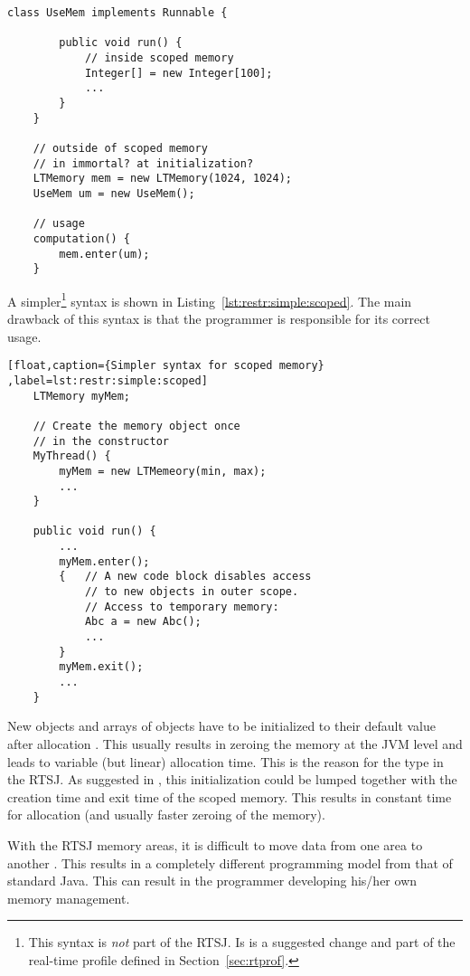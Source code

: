 \begin{lstlisting}[float,caption={Correct usage of scoped memory in the RTSJ},
label=lst:restr:correct:scoped]
    class UseMem implements Runnable {

        public void run() {
            // inside scoped memory
            Integer[] = new Integer[100];
            ...
        }
    }

    // outside of scoped memory
    // in immortal? at initialization?
    LTMemory mem = new LTMemory(1024, 1024);
    UseMem um = new UseMem();

    // usage
    computation() {
        mem.enter(um);
    }
\end{lstlisting}



A simpler\footnote{This syntax is \emph{not} part of the RTSJ. Is is
a suggested change and part of the real-time profile defined in
Section~\ref{sec:rtprof}.} syntax is shown in
Listing~\ref{lst:restr:simple:scoped}. The main drawback of this
syntax is that the programmer is responsible for its correct usage.

\begin{lstlisting}[float,caption={Simpler syntax for scoped memory}
,label=lst:restr:simple:scoped]
    LTMemory myMem;

    // Create the memory object once
    // in the constructor
    MyThread() {
        myMem = new LTMemeory(min, max);
        ...
    }

    public void run() {
        ...
        myMem.enter();
        {   // A new code block disables access
            // to new objects in outer scope.
            // Access to temporary memory:
            Abc a = new Abc();
            ...
        }
        myMem.exit();
        ...
    }
\end{lstlisting}

New objects and arrays of objects have to be initialized to their
default value after allocation \cite{jvm}. This usually results in
zeroing the memory at the JVM level and leads to variable (but
linear) allocation time. This is the reason for the type
 in the RTSJ. As suggested in \cite{701668}, this
initialization could be lumped together with the creation time and
exit time of the scoped memory. This results in constant time for
allocation (and usually faster zeroing of the memory).


With the RTSJ memory areas, it is difficult to move data from one
area to another \cite{Niessner03}. This results in a completely
different programming model from that of standard Java. This can
result in the programmer developing his/her own memory management.

